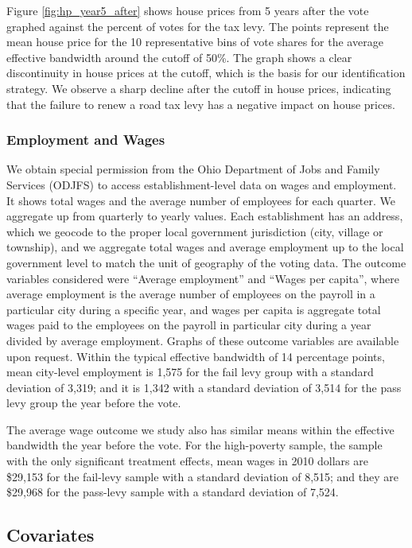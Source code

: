 Figure \ref{fig:hp_year5_after} shows house prices from 5 years after the vote graphed against the percent of votes for the tax levy. The points represent the mean house price for the 10 representative bins of vote shares for the average effective bandwidth around the cutoff of 50\%. The graph shows a clear discontinuity in house prices at the cutoff, which is the basis for our identification strategy. We observe a sharp decline after the cutoff in house prices, indicating that the failure to renew a road tax levy has a negative impact on house prices.


\subsubsection{Employment and Wages}

We obtain special permission from the Ohio Department of Jobs and Family Services (ODJFS) to access establishment-level data on wages and employment.  It shows total wages and the average number of employees for each quarter.  We aggregate up from quarterly to yearly values.  Each establishment has an address, which we geocode to the proper local government jurisdiction (city, village or township), and we aggregate total wages and average employment up to the local government level to match the unit of geography of the voting data. The outcome variables considered were “Average employment” and “Wages per capita”, where average employment is the average number of employees on the payroll in a particular city during a specific year, and wages per capita is aggregate total wages paid to the employees on the payroll in particular city during a year divided by average employment. Graphs of these outcome variables are available upon request.  Within the typical effective bandwidth of 14 percentage points, mean city-level employment is 1,575 for the fail levy group with a standard deviation of 3,319; and it is 1,342 with a standard deviation of 3,514 for the pass levy group the year before the vote.  

The average wage outcome we study also has similar means within the effective bandwidth the year before the vote.  For the high-poverty sample, the sample with the only significant treatment effects, mean wages in 2010 dollars are \$29,153 for the fail-levy sample with a standard deviation of 8,515; and they are \$29,968 for the pass-levy sample with a standard deviation of 7,524.

\subsection{Covariates}

